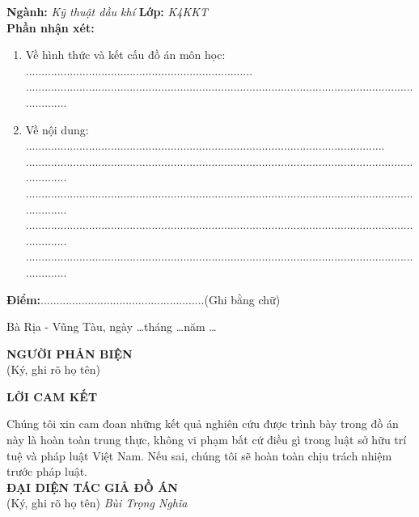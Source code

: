 \documentclass[12pt,a4paper]{article}
\begin{document}
\textbf{Ngành:} \textit{Kỹ thuật dầu khí} \hspace{130pt} \textbf{Lớp:} \textit{K4KKT}
\\ \textbf{Phần nhận xét:}
\begin{enumerate}
	\item Về hình thức và kết cấu đồ án môn học: ........................................................................\\........................................................................................................................................
	\item Về nội dung: ..................................................................................................................\\........................................................................................................................................\\........................................................................................................................................\\........................................................................................................................................\\........................................................................................................................................
\end{enumerate}
\textbf{Điểm:}....................................................(Ghi bằng chữ)
\begin{flushright}
Bà Rịa - Vũng Tàu, ngày \ldots tháng \ldots năm \ldots \\
\end{flushright}
\hspace{300pt} \textbf{NGƯỜI PHẢN BIỆN}\\
\hspace*{310pt} (Ký, ghi rõ họ tên)
\newpage
\begin{center}
	\centering
	\textbf{LỜI CAM KẾT}
\end{center}
Chúng tôi xin cam đoan những kết quả nghiên cứu được trình bày trong đồ án này là hoàn toàn trung thực, không vi phạm bất cứ điều gì trong luật sở hữu trí tuệ và pháp luật Việt Nam. Nếu sai, chúng tôi sẽ hoàn toàn chịu trách nhiệm trước pháp luật.\\
\hspace*{250pt} \textbf{ĐẠI DIỆN TÁC GIẢ ĐỒ ÁN}\\
\hspace*{280pt} (Ký, ghi rõ họ tên)
\newline
\newline
\hspace*{282pt} \textit{Bùi Trọng Nghĩa}
\end{document}
